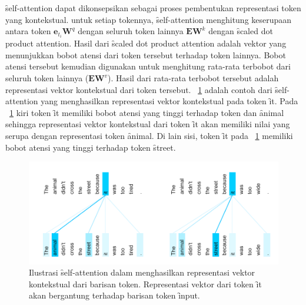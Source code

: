 	\f{self-attention} dapat dikonsepsikan sebagai proses pembentukan representasi token yang kontekstual. untuk setiap tokennya, \f{self-attention} menghitung keserupaan antara token $\mathbf{e}_{t_i} \mathbf{W}^q$ dengan seluruh token lainnya $\mathbf{E} \mathbf{W}^k$ dengan \f{scaled dot product attention}. Hasil dari \f{scaled dot product attention} adalah vektor yang menunjukkan bobot atensi dari token tersebut terhadap token lainnya. Bobot atensi tersebut kemudian digunakan untuk menghitung rata-rata terbobot dari seluruh token lainnya ($\mathbf{E} \mathbf{W}^v$). Hasil dari rata-rata terbobot tersebut adalah representasi vektor kontekstual dari token tersebut. \pic~\ref{fig:self-attention-example} adalah contoh dari \f{self-attention} yang menghasilkan representasi vektor kontekstual pada token \f{it}. Pada \pic~\ref{fig:self-attention-example} kiri token \f{it} memiliki bobot atensi yang tinggi terhadap token dan \f{animal} sehingga representasi vektor kontekstual dari token \f{it} akan memiliki nilai yang serupa dengan representasi token \f{animal}. Di lain sisi, token \f{it} pada \pic~\ref{fig:self-attention-example} memiliki bobot atensi yang tinggi terhadap token \f{street}.
	\begin{figure}
		\centering
		\includegraphics[width=1\textwidth]{assets/pics/self-attn-example.png}
		\caption{Ilustrasi \f{self-attention} dalam menghasilkan representasi vektor kontekstual dari barisan token. Representasi vektor dari token \f{it} akan bergantung terhadap barisan token \f{input}.}
		\label{fig:self-attention-example}
	\end{figure}
	

